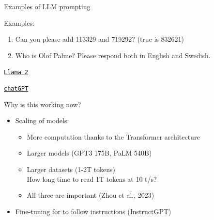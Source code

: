 \documentclass[10pt]{beamer}
\begin{document}
\begin{frame}{Examples of LLM prompting}

Examples:
\begin{enumerate}
\item Can you please add 113329 and 719292? (true is 832621)
\item Who is Olof Palme? Please respond both in English and Swedish.
\end{enumerate}

\centering

\vspace{5mm}

\href{https://www.llama2.ai/}{\texttt{Llama 2}}

\vspace{10mm}

\href{https://chat.openai.com/}{\texttt{chatGPT}}

\end{frame}


\begin{frame}{Why is this working now?}

\begin{itemize}
\item Scaling of models:
\begin{itemize}
\item More computation thanks to the Transformer architecture\pause
\item Larger models (GPT3 175B, PaLM 540B)\pause
\item Larger datasets (1-2T tokens)
\\ How long time to read 1T tokens at 10 t/s?\pause %
\item All three are important (Zhou et al., 2023)\\
\end{itemize}
\pause
\item Fine-tuning for to follow instructions (InstructGPT)
\end{itemize}

\end{frame}




\end{document}
